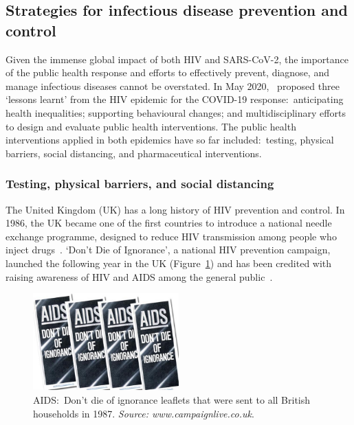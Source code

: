 \subsection{Strategies for infectious disease prevention and control}\label{sec:prevention-strategies}

Given the immense global impact of both HIV and SARS-CoV-2, the importance of the public health response and efforts to effectively prevent, diagnose, and manage infectious diseases cannot be overstated. In May 2020,~\cite{Hargreaves2020-hr} proposed three `lessons learnt' from the HIV epidemic for the COVID-19 response:\ anticipating health inequalities; supporting behavioural changes; and multidisciplinary efforts to design and evaluate public health interventions. The public health interventions applied in both epidemics have so far included:\ testing, physical barriers, social distancing, and pharmaceutical interventions.

\subsubsection{Testing, physical barriers, and social distancing}

The United Kingdom (UK) has a long history of HIV prevention and control. In 1986, the UK became one of the first countries to introduce a national needle exchange programme, designed to reduce HIV transmission among people who inject drugs~\parencite{Vlahov1998-qe}. `Don't Die of Ignorance', a national HIV prevention campaign, launched the following year in the UK (Figure~\ref{fig:aids-leaflet}) and has been credited with raising awareness of HIV and AIDS among the general public~\parencite{Fowler2014-cx}.

\begin{figure}[htbp!]
  \centering
  \includegraphics[width=0.5\textwidth]{aids-leaflet.jpg}
  \caption[AIDS:\ Don't die of ignorance leaflets sent to all British households in 1987]{AIDS:\ Don't die of ignorance leaflets that were sent to all British households in 1987\@. \textit{Source: www.campaignlive.co.uk}.}\label{fig:aids-leaflet}
\end{figure}

